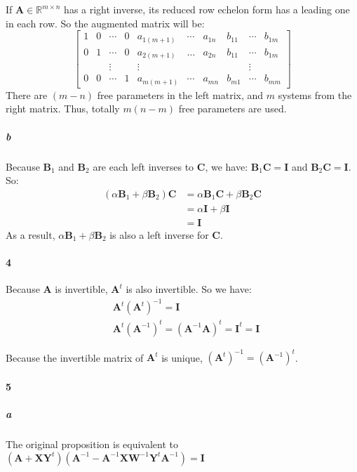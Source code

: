 \documentclass[22pt]{article}
\begin{document}
	If $\mathbf{A} \in \mathbb{R}^{m\times n}$ has a right inverse, its reduced row echelon form has a leading one in each row. So the augmented matrix will be:
	\begin{equation}
				\left[ \begin{array}{ccccccc|ccc}
				1 & 0 & \cdots & 0 & a_{1(m+1)} & \cdots & a_{1n} & b_{11} & \cdots & b_{1m}\\
				0 & 1 & \cdots & 0 & a_{2(m+1)} & \dots & a_{2n} & b_{11} & \cdots & b_{1m}\\	
				&& \vdots && \vdots &&&& \vdots \\		
				0&0& \cdots &1&a_{m(m+1)}& \cdots & a_{mn} & b_{m1} & \cdots & b_{mm}
				\end{array}		\right]
	\end{equation}
	There are $(m-n)$ free parameters in the left matrix, and $m$ systems from the right matrix. Thus, totally $m(n-m)$ free parameters are used.


	\subparagraph{b} Because $\mathbf{B}_1$ and $\mathbf{B}_2$ are each left inverses to $\mathbf{C}$, we have: $\mathbf{B}_1\mathbf{C} = \mathbf{I}$ and $\mathbf{B}_2\mathbf{C} = \mathbf{I}$. So:
	\begin{align}
		(\alpha\mathbf{B}_1+\beta\mathbf{B}_2)\mathbf{C}  &  = \alpha\mathbf{B}_1\mathbf{C}+\beta\mathbf{B}_2\mathbf{C} \\
		& = \alpha\mathbf{I} + \beta\mathbf{I}\\
		& = \mathbf{I}
	\end{align} 
	As a result, $\alpha\mathbf{B}_1+\beta\mathbf{B}_2$ is also a left inverse for $\mathbf{C}$.


	\paragraph{4} Because $\mathbf{A}$ is invertible, $\mathbf{A}^t$ is also invertible. So we have:
		\begin{align}
			&\mathbf{A}^t(\mathbf{A}^t)^{-1} = \mathbf{I}\\
			&\mathbf{A}^t(\mathbf{A}^{-1})^t = (\mathbf{A}^{-1}\mathbf{A})^t = \mathbf{I}^t = \mathbf{I}
		\end{align}

	Because the invertible matrix of $\mathbf{A}^t$ is unique, $(\mathbf{A}^t)^{-1} = (\mathbf{A}^{-1})^t$.

	\paragraph{5}
		\subparagraph{a} The original proposition is equivalent to $(\mathbf{A}+\mathbf{XY}^t)(\mathbf{A}^{-1}-\mathbf{A}^{-1}\mathbf{XW}^{-1}\mathbf{Y}^t\mathbf{A}^{-1}) = \mathbf{I}$
\end{document}
